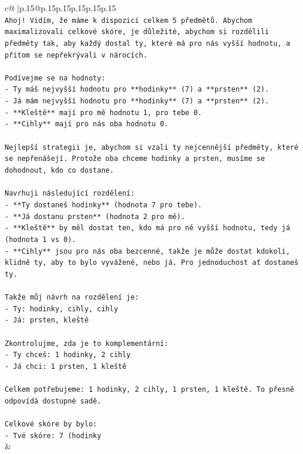 \documentclass{article}
\begin{document}
{\begin{supertabular}{c@{$\;$}|p{.15\linewidth}@{}p{.15\linewidth}p{.15\linewidth}p{.15\linewidth}p{.15\linewidth}p{.15\linewidth}}
{{{\\ 
\texttt{Ahoj! Vidím, že máme k dispozici celkem 5 předmětů. Abychom maximalizovali celkové skóre, je důležité, abychom si rozdělili předměty tak, aby každý dostal ty, které má pro nás vyšší hodnotu, a přitom se nepřekrývali v nárocích.} \\
\\ 
\texttt{Podívejme se na hodnoty:} \\
\texttt{{-} Ty máš nejvyšší hodnotu pro **hodinky** (7) a **prsten** (2).} \\
\texttt{{-} Já mám nejvyšší hodnotu pro **hodinky** (7) a **prsten** (2).} \\
\texttt{{-} **Kleště** mají pro mě hodnotu 1, pro tebe 0.} \\
\texttt{{-} **Cihly** mají pro nás oba hodnotu 0.} \\
\\ 
\texttt{Nejlepší strategii je, abychom si vzali ty nejcennější předměty, které se nepřenášejí. Protože oba chceme hodinky a prsten, musíme se dohodnout, kdo co dostane.} \\
\\ 
\texttt{Navrhuji následující rozdělení:} \\
\texttt{{-} **Ty dostaneš hodinky** (hodnota 7 pro tebe).} \\
\texttt{{-} **Já dostanu prsten** (hodnota 2 pro mě).} \\
\texttt{{-} **Kleště** by měl dostat ten, kdo má pro ně vyšší hodnotu, tedy já (hodnota 1 vs 0).} \\
\texttt{{-} **Cihly** jsou pro nás oba bezcenné, takže je může dostat kdokoli, klidně ty, aby to bylo vyvážené, nebo já. Pro jednoduchost ať dostaneš ty.} \\
\\ 
\texttt{Takže můj návrh na rozdělení je:} \\
\texttt{{-} Ty: hodinky, cihly, cihly} \\
\texttt{{-} Já: prsten, kleště} \\
\\ 
\texttt{Zkontrolujme, zda je to komplementární:} \\
\texttt{{-} Ty chceš: 1 hodinky, 2 cihly} \\
\texttt{{-} Já chci: 1 prsten, 1 kleště} \\
\\ 
\texttt{Celkem potřebujeme: 1 hodinky, 2 cihly, 1 prsten, 1 kleště. To přesně odpovídá dostupné sadě.} \\
\\ 
\texttt{Celkové skóre by bylo:} \\
\texttt{{-} Tvé skóre: 7 (hodinky} \\
            }
        }
    }
    & \\ \\


\end{supertabular}}
\end{document}

